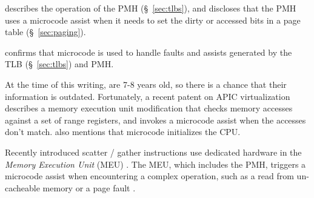 






\cite{intel1997pmh} describes the operation of the PMH (\S~\ref{sec:tlbs}), and
discloses that the PMH uses a microcode assist when it needs to set the dirty
or accessed bits in a page table (\S~\ref{sec:paging}).

\cite{intel1996dtlb} confirms that microcode is used to handle faults and
assists generated by the TLB (\S~\ref{sec:tlbs}) and PMH.

At the time of this writing, \cite{intel1997events, intel1999exceptions,
intel1997pmh, intel1999events, intel1996dtlb} are 7-8 years old, so there is a
chance that their information is outdated. Fortunately, a recent patent on APIC
virtualization \cite{intel2014vapic} describes a memory execution unit
modification that checks memory accesses against a set of range registers, and
invokes a microcode assist when the accesses don't match.
\cite{intel2014vapic} also mentions that microcode initializes the CPU.



Recently introduced scatter / gather instructions use dedicated hardware in the
\textit{Memory Execution Unit} (MEU) \cite{intel2013scattergather,
intel2014gather}. The MEU, which includes the PMH, triggers a microcode assist
when encountering a complex operation, such as a read from un-cacheable memory
or a page fault \cite{intel2014gather}.

